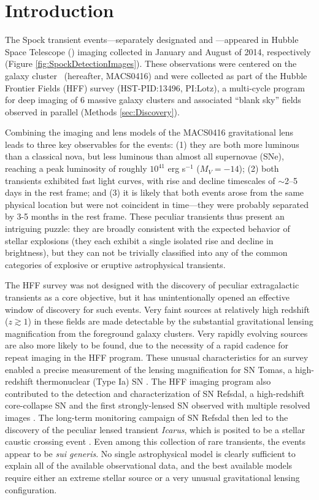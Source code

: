 \section{Introduction}\label{sec:Introduction}

The Spock transient events---separately designated \spockone and
\spocktwo---appeared in Hubble Space Telescope (\HST) imaging
collected in January and August of 2014, respectively (Figure
\ref{fig:SpockDetectionImages}).  These observations were centered on
the galaxy cluster \ (hereafter, MACS0416) and were collected
as part of the Hubble Frontier Fields (HFF) survey (HST-PID:13496,
PI:Lotz), a multi-cycle program for deep imaging of 6 massive galaxy
clusters and associated ``blank sky'' fields observed in parallel
(Methods \ref{sec:Discovery}).

Combining the \HST imaging and lens models of the MACS0416 gravitational
lens leads to three key observables for the \spock events: (1) they are
both more luminous than a classical nova, but less luminous than
almost all supernovae (SNe), reaching a peak luminosity of roughly
$10^{41}$ erg s$^{-1}$ ($M_V=−14$); (2) both transients exhibited fast
light curves, with rise and decline timescales of $\sim$2--5 days in
the rest frame; and (3) it is likely that both events arose from the
same physical location but were not coincident in time---they were
probably separated by 3-5 months in the rest frame. These peculiar
transients thus present an intriguing puzzle: they are broadly
consistent with the expected behavior of stellar explosions (they each
exhibit a single isolated rise and decline in brightness), but they
can not be trivially classified into any of the common categories of
explosive or eruptive astrophysical transients.  

The HFF survey was not designed with the discovery of peculiar
extragalactic transients as a core objective, but it has
unintentionally opened an effective window of discovery for such
events.  Very faint sources at relatively high redshift ($z\gtrsim1$)
in these fields are made detectable by the substantial gravitational
lensing magnification from the foreground galaxy clusters.  Very
rapidly evolving sources are also more likely to be found, due to the
necessity of a rapid cadence for repeat imaging in the HFF program.
These unusual characteristics for an \HST survey enabled a precise
measurement of the lensing magnification for SN Tomas, a high-redshift
thermonuclear (Type Ia) SN \citep{Rodney:2015a}.  The HFF imaging
program also contributed to the detection and characterization of SN
Refsdal, a high-redshift core-collapse SN and the first
strongly-lensed SN observed with multiple resolved images
\citep{Kelly:2015a}.  The long-term monitoring campaign of SN Refsdal
then led to the discovery of the peculiar lensed transient {\it
  Icarus}, which is posited to be a stellar caustic crossing event
\citep{Kelly:2016}.  Even among this collection of rare transients,
the \spock events appear to be {\it sui generis}.  No single
astrophysical model is clearly sufficient to explain all of the
available observational data, and the best available models require
either an extreme stellar source or a very unusual gravitational
lensing configuration.

